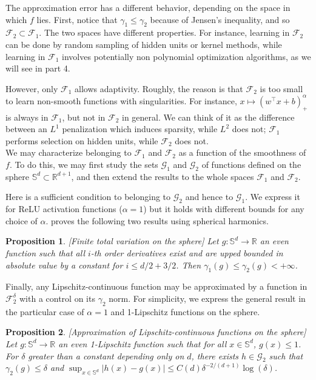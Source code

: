 \documentclass[a4paper, 11pt]{scrartcl}
\newtheorem{proposition}{Proposition}[section]
\begin{document}
{The approximation error has a different behavior, depending on the space in which $f$ lies. First, notice that $\gamma_1 \leq \gamma_2$ because of Jensen's inequality, and so $\mathcal{F}_2 \subset \mathcal{F}_1$. The two spaces have different properties. For instance, learning in $\mathcal{F}_2$ can be done by random sampling of hidden units or kernel methods, while learning in $\mathcal{F}_1$ involves potentially non polynomial optimization algorithms, as we will see in part 4.

However, only $\mathcal{F}_1$ allows adaptivity. Roughly, the reason is that $\mathcal{F}_2$ is too small to learn non-smooth functions with singularities. For instance, $x\mapsto (w^\top x+b)^\alpha_+$ is always in $\mathcal{F}_1$, but not in $\mathcal{F}_2$ in general. We can think of it as the difference between an $L^1$ penalization which induces sparsity, while $L^2$ does not; $\mathcal{F}_1$ performs selection on hidden units, while $\mathcal{F}_2$ does not.\\


We may characterize belonging to $\mathcal{F}_1$ and $\mathcal{F}_2$ as a function of the smoothness of $f$. To do this, we may first study the sets $\mathcal{G}_1$ and $\mathcal{G}_2$ of functions defined on the sphere $\mathbb{S}^d \subset \mathbb{R}^{d+1}$, and then extend the results to the whole spaces $\mathcal{F}_1$ and $\mathcal{F}_2$.

Here is a sufficient condition to belonging to $\mathcal{G}_2$ and hence to $\mathcal{G}_1$. We express it for ReLU activation functions ($\alpha=1$) but it holds with different bounds for any choice of $\alpha$. \cite{bach2017breaking} proves the following two results using spherical harmonics.

\begin{proposition}
\emph{[Finite total variation on the sphere]} Let $g : \mathbb{S}^d \rightarrow \mathbb{R}$ an even function such that all $i$-th order derivatives exist and are upped bounded in absolute value by a constant for $i \leq d/2 + 3/2$. Then $\gamma_1(g) \leq \gamma_2(g) < +\infty$.
\end{proposition}

Finally, any Lipschitz-continuous function may be approximated by a function in $\mathcal{F}_2^\delta$ with a control on its $\gamma_2$ norm. For simplicity, we express the general result in the particular case of $\alpha = 1$ and 1-Lipschitz functions on the sphere.

\begin{proposition}
\emph{[Approximation of Lipschitz-continuous functions on the sphere]} Let $g : \mathbb{S}^d \rightarrow \mathbb{R}$ an even 1-Lipschitz function such that for all $x \in  \mathbb{S}^d$, $g(x) \leq 1$. For $\delta$ greater than a constant depending only on $d$, there exists $h\in \mathcal{G}_2$ such that $\gamma_2(g) \leq \delta$ and $\sup_{x \in  \mathbb{S}^d} |h(x) - g(x)| \leq C(d) \delta^{-2/(d+1)} \log(\delta)$.
\end{proposition}

}
\end{document}
